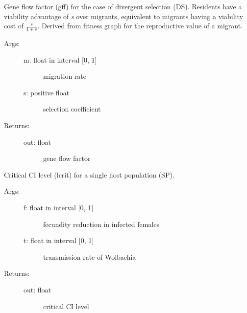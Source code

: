 \documentclass[letterpaper,10pt,english]{sphinxmanual}
\begin{document}
\begin{fulllineitems}
\label{index:wspec.analytical.gff_DS}
Gene flow factor (gff) for the case of divergent selection (DS).
Residents have a viability advantage of \emph{s} over migrants, 
equivalent to migrants having a viability cost of $\frac{s}{1+s}$.
Derived from fitness graph for the reproductive value of a migrant.
\begin{description}
\item[{Args:}] \leavevmode\begin{description}
\item[{m: float in interval {[}0, 1{]}}] \leavevmode
migration rate

\item[{s: positive float}] \leavevmode
selection coefficient

\end{description}

\item[{Returns:}] \leavevmode\begin{description}
\item[{out: float}] \leavevmode
gene flow factor

\end{description}

\end{description}

\end{fulllineitems}


\begin{fulllineitems}
\label{index:wspec.analytical.lcrit_SP}
Critical CI level (lcrit) for a single host population (SP).
\begin{description}
\item[{Args:}] \leavevmode\begin{description}
\item[{f: float in interval {[}0, 1{]}}] \leavevmode
fecundity reduction in infected females

\item[{t: float in interval {[}0, 1{]}}] \leavevmode
transmission rate of Wolbachia

\end{description}

\item[{Returns:}] \leavevmode\begin{description}
\item[{out: float}] \leavevmode
critical CI level

\end{description}

\end{description}

\end{fulllineitems}
\end{document}
